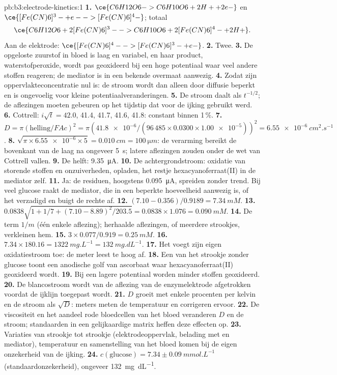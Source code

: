 \begin{solution}{pb:b3:electrode-kinetics:1}
\textbf{1.} $\ce{C6H12O6 -> C6H10O6 + 2 H+ + 2 e-}$ en $\ce{[Fe(CN)6]^3- + e- -> [Fe(CN)6]^4-}$;
totaal
\[
  \ce{C6H12O6 + 2 [Fe(CN)6]^3- -> C6H10O6 + 2 [Fe(CN)6]^4- + 2 H+} .
\]
Aan de elektrode: $\ce{[Fe(CN)6]^4- -> [Fe(CN)6]^3- + e-}$.
\textbf{2.} Twee.
\textbf{3.} De opgeloste zuurstof in bloed is laag en variabel, en haar
product, waterstofperoxide, wordt pas geoxideerd bij een hoge potentiaal
waar veel andere stoffen reageren; de mediator is in een bekende overmaat
aanwezig.
\textbf{4.} Zodat zijn oppervlakteconcentratie nul is: de stroom wordt dan
alleen door diffusie beperkt en is ongevoelig voor kleine
potentiaalveranderingen.
\textbf{5.} De stroom daalt als $t^{-1/2}$; de aflezingen moeten gebeuren op
het tijdstip dat voor de ijking gebruikt werd.
\textbf{6.} Cottrell: $i\sqrt t = 42.0$, 41.4, 41.7, 41.6, 41.8: constant
binnen 1\,\%.
\textbf{7.} $D = \pi(\text{helling}/FAc)^2 = \pi(\num{41.8e-6}/(96\,485 \times 0.0300 \times \num{1.00e-5}))^2 = \qty{6.55e-6}{cm^2.s^{-1}}$.
\textbf{8.} $\sqrt{\pi \times \num{6.55e-6} \times 5} = \qty{0.010}{cm} = \qty{100}{\micro m}$:
de verarming bereikt de bovenkant van de laag na ongeveer \qty{5}{s};
latere aflezingen zouden onder de wet van Cottrell vallen.
\textbf{9.} De helft: \qty{9.35}{\micro A}.
\textbf{10.} De achtergrondstroom: oxidatie van storende stoffen en
onzuiverheden, opladen, het restje hexacyanoferraat(II) in de mediator
zelf.
\textbf{11.} Ja: de residuen, hoogstens \qty{0.095}{\micro A}, spreiden
zonder trend. Bij veel glucose raakt de mediator, die in een beperkte
hoeveelheid aanwezig is, of het  verzadigd en buigt de rechte af.
\textbf{12.} $(7.10 - 0.356)/0.9189 = \qty{7.34}{mM}$.
\textbf{13.} $0.0838\sqrt{1 + 1/7 + (7.10 - 8.89)^2/203.5} = 0.0838 \times 1.076 = \qty{0.090}{mM}$.
\textbf{14.} De term $1/m$ (één enkele aflezing); herhaalde aflezingen, of
meerdere strookjes, verkleinen hem.
\textbf{15.} $3 \times 0.077/0.919 = \qty{0.25}{mM}$.
\textbf{16.} $7.34 \times 180.16 = \qty{1322}{mg.L^{-1}} = \qty{132}{mg.dL^{-1}}$.
\textbf{17.} Het voegt zijn eigen oxidatiestroom toe: de meter leest te hoog
af.
\textbf{18.} Een  van het strookje zonder glucose toont een
anodische golf van ascorbaat waar hexacyanoferraat(II) geoxideerd wordt.
\textbf{19.} Bij een lagere potentiaal worden minder stoffen geoxideerd.
\textbf{20.} De blancostroom wordt van de aflezing van de enzymelektrode
afgetrokken voordat de ijklijn toegepast wordt.
\textbf{21.} $D$ groeit met enkele procenten per kelvin en de stroom als
$\sqrt D$: meters meten de temperatuur en corrigeren ervoor.
\textbf{22.} De viscositeit en het aandeel rode bloedcellen van het bloed
veranderen $D$ en de stroom; standaarden in een gelijkaardige matrix heffen
deze effecten op.
\textbf{23.} Variaties van strookje tot strookje (elektrodeoppervlak,
belading met  en mediator), temperatuur en samenstelling van het
bloed komen bij de eigen onzekerheid van de ijking.
\textbf{24.} \textbf{$c(\text{glucose}) = 7.34 \pm \qty{0.09}{mmol.L^{-1}}$}
(standaardonzekerheid), ongeveer \qty{132}{mg.dL^{-1}}.
\end{solution}
